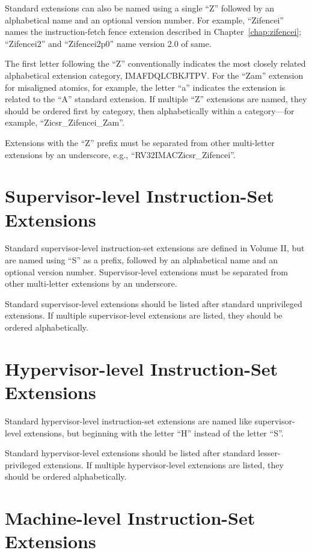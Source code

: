 Standard extensions can also be named using a single ``Z'' followed by an
alphabetical name and an optional version number.  For example,
``Zifencei'' names the instruction-fetch fence extension described in
Chapter~\ref{chap:zifencei}; ``Zifencei2'' and ``Zifencei2p0'' name version
2.0 of same.

The first letter following the ``Z'' conventionally indicates the most closely
related alphabetical extension category, IMAFDQLCBKJTPV.  For the ``Zam''
extension for misaligned atomics, for example, the letter ``a'' indicates the
extension is related to the ``A'' standard extension.  If multiple ``Z''
extensions are named, they should be ordered first by category, then
alphabetically within a category---for example, ``Zicsr\_Zifencei\_Zam''.

Extensions with the ``Z'' prefix must be separated
from other multi-letter extensions by an underscore, e.g.,
``RV32IMACZicsr\_Zifencei''.

\section{Supervisor-level Instruction-Set Extensions}

Standard supervisor-level instruction-set extensions are defined in Volume II,
but are named using ``S'' as a prefix, followed by an alphabetical name and an
optional version number.  Supervisor-level extensions must be separated from
other multi-letter extensions by an underscore.

Standard supervisor-level extensions should be listed after standard
unprivileged extensions.  If multiple supervisor-level extensions are listed,
they should be ordered alphabetically.

\section{Hypervisor-level Instruction-Set Extensions}

Standard hypervisor-level instruction-set extensions are named like
supervisor-level extensions, but beginning with the letter ``H'' instead of
the letter ``S''.

Standard hypervisor-level extensions should be listed after standard
lesser-privileged extensions.  If multiple hypervisor-level extensions are
listed, they should be ordered alphabetically.

\section{Machine-level Instruction-Set Extensions}

